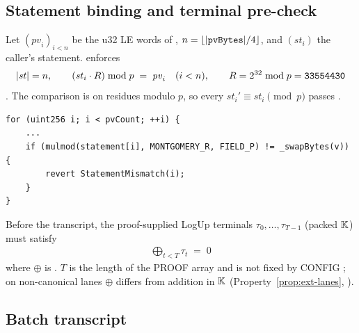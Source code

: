 \subsection{Statement binding and terminal pre-check}
\label{subsec:sv-statement}

Let $(\mathit{pv}_i)_{i<n}$ be the u32 LE words of , $n =
\lfloor|\texttt{pvBytes}|/4\rfloor$, and $(\mathit{st}_i)$ the caller's
 statement.  enforces
\begin{align}
  |\mathit{st}| = n, \qquad
  (\mathit{st}_i \cdot R) \bmod p \;=\; \mathit{pv}_i \quad (i<n),
  \qquad R = 2^{32} \bmod p = \texttt{33554430}
  \label{eq:sv-stm}
\end{align}
. The comparison is on residues modulo $p$, so
every $\mathit{st}_i' \equiv \mathit{st}_i \pmod p$ passes .
\begin{Verbatim}[fontsize=\small]
for (uint256 i; i < pvCount; ++i) {
    ...
    if (mulmod(statement[i], MONTGOMERY_R, FIELD_P) != _swapBytes(v)) {
        revert StatementMismatch(i);
    }
}
\end{Verbatim}

Before the transcript, the proof-supplied LogUp terminals
$\tau_0,\dots,\tau_{T-1}$ (packed $\mathbb{K}$) must satisfy
\begin{align}
  \textstyle\bigoplus_{t<T} \tau_t \;=\; 0
\end{align}
where $\oplus$ is  
. $T$ is the length of the PROOF array and is not
fixed by CONFIG ; on non-canonical lanes $\oplus$ differs from
addition in $\mathbb{K}$ (Property~\ref{prop:ext-lanes}, ).

\subsection{Batch transcript}
\label{subsec:sv-batch}

